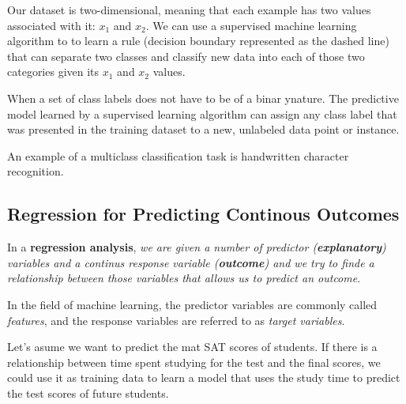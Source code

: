 \documentclass[../machine_learning_scikit.tex]{subfiles}
\begin{document}
    Our dataset is two-dimensional, meaning that each example has two values associated with it: $x_1$ and $x_2$. We can use a supervised machine learning algorithm to to learn a rule (decision boundary represented as the dashed line) that can separate two classes and classify new data into each of those two categories given its $x_1$ and $x_2$ values.

    \begin{obs}
        When a set of class labels does not have to be of a binar ynature. The predictive model learned by a supervised learning algorithm can assign any class label that was presented in the training dataset to a new, unlabeled data point or instance.
    \end{obs}

    \begin{exa}
        An example of a multiclass classification task is handwritten character recognition.
    \end{exa}

    \subsection{Regression for Predicting Continous Outcomes}

    \begin{mydef}
        In a \textbf{regression analysis}, \textit{we are given a number of predictor (\textbf{explanatory}) variables and a continus response variable (\textbf{outcome}) and we try to finde a relationship between those variables that allows us to predict an outcome}.
    \end{mydef}

    \begin{obs}
        In the field of machine learning, the predictor variables are commonly called \textit{features}, and the response variables are referred to as \textit{target variables}.
    \end{obs}

    \begin{exa}
        Let's asume we want to predict the mat SAT scores of students. If there is a relationship between time spent studying for the test and the final scores, we could use it as training data to learn a model that uses the study time to predict the test scores of future students.
    \end{exa}
\end{document}
